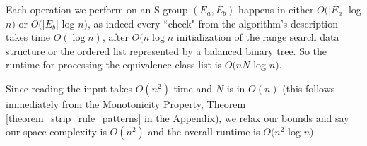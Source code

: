 Each operation we perform on an S-group $(E_a,E_b)$ happens in either 
$O(|E_a|$ log $n)$ or $O(|E_b|$ log $n)$, as indeed 
every ``check" from the algorithm's description takes time $O(\log n)$,
after $O(n \log n$ initialization of the range search data structure
or the ordered list represented by a balanced binary tree.
So the runtime for processing the equivalence class list is $O(nN$ log $n)$.

Since reading the input takes $O(n^2)$ time and $N$ is in $O(n)$
(this follows immediately from the Monotonicity Property,
 Theorem \ref{theorem_strip_rule_patterns} in the Appendix),
 we relax our bounds and say our space complexity is $O(n^2)$
 and the overall runtime is $O(n^2$ log $n)$.

